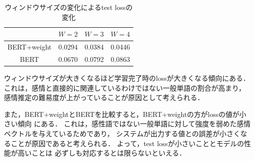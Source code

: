 	\begin{table}[H]
		\centering
		\caption{ウィンドウサイズの変化によるtest lossの変化}
		\label{table:window_size}
		\begin{tabular}{|c|c|c|c|}
			\hline
			& $W=2$ & $W=3$ & $W=4$ \\
			\hline
			BERT+weight & 0.0294 & 0.0384 & 0.0446 \\
			\hline
			BERT & 0.0670 & 0.0792 & 0.0863 \\
			\hline
		\end{tabular}
	\end{table}

	ウィンドウサイズが大きくなるほど学習完了時のlossが大きくなる傾向にある．
	これは，感情と直接的に関連しているわけではない一般単語の割合が高まり，
	感情推定の難易度が上がっていることが原因として考えられる．

	また，BERT+weightとBERTを比較すると，BERT+weightの方がlossの値が小さい傾向
	にある．
	これは，感性語ではない一般単語に対して強度を弱めた感情ベクトルを与えているためであり，
	システムが出力する値との誤差が小さくなることが原因であると考えられる．
	よって，test lossが小さいこととモデルの性能が高いことは
	必ずしも対応するとは限らないといえる．